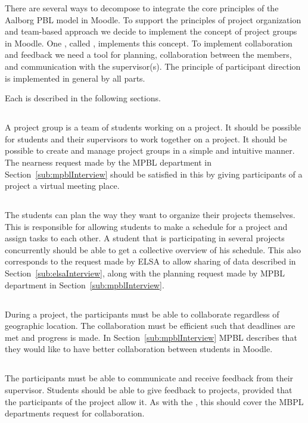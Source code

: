 There are several ways to decompose \system{} to integrate the core principles of the Aalborg PBL model in Moodle. 
To support the principles of project organization and team-based approach we decide to implement the concept of project groups in Moodle.
One \subsystem{}, called \administrationgroup{}, implements this concept.
To implement collaboration and feedback we need a tool for planning, collaboration between the members, and communication with the supervisor(s). 
The principle of participant direction is implemented in general by all parts. 

Each \subsystem{} is described in the following sections.

\subsection{\administrationgroup{}} %
\label{sec:admgroupdecom}
A project group is a team of students working on a project.
It should be possible for students and their supervisors to work together on a project.
It should be possible to create and manage project groups in a simple and intuitive manner.
The nearness request made by the MPBL department in Section~\ref{sub:mpblInterview} should be satisfied in this \subsystem{} by giving participants of a project a virtual meeting place.

\subsection{\timelinegroup{}} %
\label{sec:tmlgroupdecom}
The students can plan the way they want to organize their projects themselves.
This \subsystem{} is responsible for allowing students to make a schedule for a project and assign tasks to each other.
A student that is participating in several projects concurrently should be able to get a collective overview of his schedule.
This also corresponds to the request made by ELSA to allow sharing of data described in Section~\ref{sub:elsaInterview}, along with the planning request made by MPBL department in Section~\ref{sub:mpblInterview}.

\subsection{\blackboardgroup{}} %
During a project, the participants must be able to collaborate regardless of geographic location.
The collaboration must be efficient such that deadlines are met and progress is made.
In Section~\ref{sub:mpblInterview} MPBL describes that they would like to have better collaboration between students in Moodle.

\subsection{\supervisorgroup{}} %
\label{sub:supervisorPluginDescription}
The participants must be able to communicate and receive feedback from their supervisor.
Students should be able to give feedback to projects, provided that the participants of the project allow it.
As with the \blackboardgroup{} \subsystem{}, this \subsystem{} should cover the MBPL departments request for collaboration.


